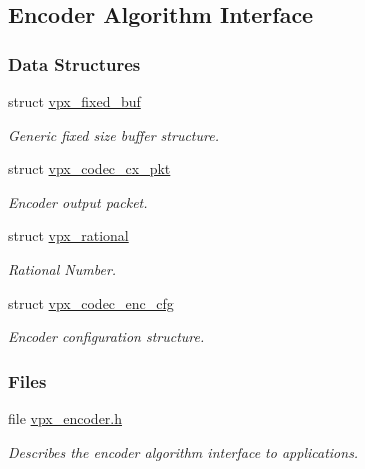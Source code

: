 \hypertarget{group__encoder}{
\subsection{\-Encoder \-Algorithm \-Interface}
\label{group__encoder}
}
\subsubsection*{\-Data \-Structures}
\begin{DoxyCompactItemize}
\item 
struct \hyperlink{structvpx__fixed__buf}{vpx\-\_\-fixed\-\_\-buf}
\begin{DoxyCompactList}\small\item\em \-Generic fixed size buffer structure. \end{DoxyCompactList}\item 
struct \hyperlink{structvpx__codec__cx__pkt}{vpx\-\_\-codec\-\_\-cx\-\_\-pkt}
\begin{DoxyCompactList}\small\item\em \-Encoder output packet. \end{DoxyCompactList}\item 
struct \hyperlink{structvpx__rational}{vpx\-\_\-rational}
\begin{DoxyCompactList}\small\item\em \-Rational \-Number. \end{DoxyCompactList}\item 
struct \hyperlink{structvpx__codec__enc__cfg}{vpx\-\_\-codec\-\_\-enc\-\_\-cfg}
\begin{DoxyCompactList}\small\item\em \-Encoder configuration structure. \end{DoxyCompactList}\end{DoxyCompactItemize}
\subsubsection*{\-Files}
\begin{DoxyCompactItemize}
\item 
file \hyperlink{vpx__encoder_8h}{vpx\-\_\-encoder.\-h}
\begin{DoxyCompactList}\small\item\em \-Describes the encoder algorithm interface to applications. \end{DoxyCompactList}\end{DoxyCompactItemize}
